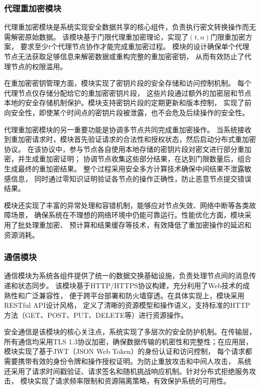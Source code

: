 \subsubsection{代理重加密模块}
代理重加密模块是系统实现安全数据共享的核心组件，负责执行密文转换操作而无需解密原始数据。
该模块基于门限代理重加密理论，实现了$(t,n)$门限重加密方案，
要求至少$t$个代理节点协作才能完成重加密过程。
模块的设计确保单个代理节点无法获取足够信息来解密数据或重构完整的重加密密钥，
从而有效防止了代理节点的权限滥用。

在重加密密钥管理方面，模块实现了密钥片段的安全存储和访问控制机制。
每个代理节点仅存储分配给它的重加密密钥片段，
这些片段通过额外的加密层和节点本地的安全存储机制保护。模块支持密钥片段的定期更新和版本控制，
实现了前向安全性，即使某个时间点的密钥片段被泄露，也不会危及后续操作的安全性。

代理重加密模块的另一重要功能是协调多节点共同完成重加密操作。
当系统接收到重加密请求时，模块首先验证请求的合法性和授权状态，然后启动分布式重加密协议。
在该协议中，参与节点各自使用本地存储的密钥片段对密文进行部分重加密，并生成重加密证明；
协调节点收集这些部分结果，在达到门限数量后，组合生成最终的重加密结果。
整个过程采用安全多方计算技术确保中间结果不泄露敏感信息，
同时通过零知识证明验证各节点的操作正确性，防止恶意节点提交错误结果。

模块还实现了丰富的异常处理和容错机制，能够应对节点失效、网络中断等各类故障场景，
确保系统在不理想的网络环境中仍能可靠运行。性能优化方面，模块采用了批处理重加密、
预计算和结果缓存等技术，有效降低了重加密操作的延迟和资源消耗。

\subsubsection{通信模块}
通信模块为系统各组件提供了统一的数据交换基础设施，负责处理节点间的消息传递和状态同步。
该模块基于HTTP/HTTPS协议构建，充分利用了Web技术的成熟性和广泛兼容性，
便于跨平台部署和防火墙穿透。在具体实现上，模块采用RESTful API设计风格，
定义了清晰的资源模型和操作语义，支持标准的HTTP方法（GET、POST、PUT、DELETE等）进行资源操作。

安全通信是该模块的核心关注点，系统实现了多层次的安全防护机制。在传输层，
所有通信均采用TLS 1.3协议加密，确保数据传输的机密性和完整性；在应用层，
模块实现了基于JWT（JSON Web Token）的身份认证和访问控制，
每个请求都需要携带有效的身份令牌和操作授权证明。为防止重放攻击和中间人攻击，
系统还采用了请求时间戳验证、请求签名和随机挑战响应机制。针对分布式拒绝服务攻击，
模块实现了请求频率限制和资源隔离策略，有效保护系统的可用性。

